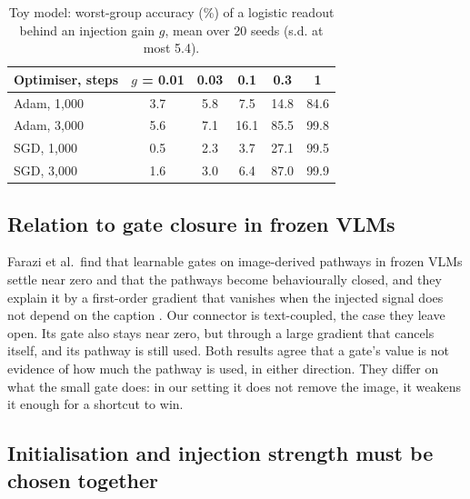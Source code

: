 \begin{table}[t]
\centering
\caption{Toy model: worst-group accuracy (\%) of a logistic readout behind an injection gain \(g\), mean over 20 seeds
(s.d. at most 5.4). \label{tab:toy}}
\footnotesize
\begin{tabular}{@{}lccccc@{}}
\toprule
Optimiser, steps & \(g\) = 0.01 & 0.03 & 0.1 & 0.3 & 1 \\
\midrule
Adam, 1,000 & 3.7 & 5.8 & 7.5 & 14.8 & 84.6 \\
Adam, 3,000 & 5.6 & 7.1 & 16.1 & 85.5 & 99.8 \\
SGD, 1,000 & 0.5 & 2.3 & 3.7 & 27.1 & 99.5 \\
SGD, 3,000 & 1.6 & 3.0 & 6.4 & 87.0 & 99.9 \\
\bottomrule
\end{tabular}
\end{table}

\subsection{Relation to gate closure in frozen VLMs}

Farazi et al.~find that learnable gates on image-derived pathways in frozen VLMs settle near zero and that the
pathways become behaviourally closed, and they explain it by a first-order gradient that vanishes when the injected
signal does not depend on the caption \citep{farazi2026gate}. Our connector is text-coupled, the case they leave open. Its
gate also stays near zero, but through a large gradient that cancels itself, and its pathway is still used. Both
results agree that a gate's value is not evidence of how much the pathway is used, in either direction. They differ on
what the small gate does: in our setting it does not remove the image, it weakens it enough for a shortcut to win.

\subsection{Initialisation and injection strength must be chosen together}

